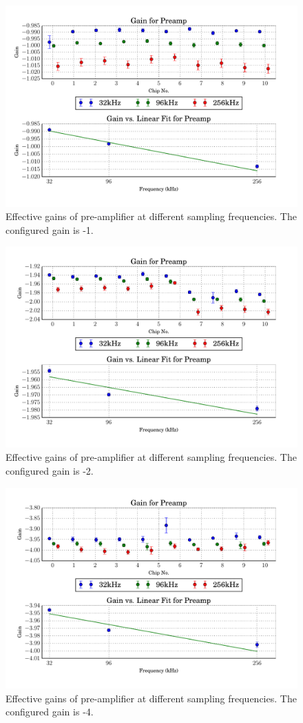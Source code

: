 \begin{figure}
    \centering
    \includegraphics[width=.7\linewidth]{images/plots/dc_slope_preamp_gain-1.pdf}
    \caption{Effective gains of pre-amplifier at different sampling frequencies. The configured gain is -1.}
    \label{fig:preamp_slope-1}
\end{figure}
\begin{figure}
    \centering
    \includegraphics[width=.7\linewidth]{images/plots/dc_slope_preamp_gain-2.pdf}
    \caption{Effective gains of pre-amplifier at different sampling frequencies. The configured gain is -2.}
    \label{fig:preamp_slope-2}
\end{figure}
\begin{figure}
    \centering
    \includegraphics[width=.7\linewidth]{images/plots/dc_slope_preamp_gain-4.pdf}
    \caption{Effective gains of pre-amplifier at different sampling frequencies. The configured gain is -4.}
    \label{fig:preamp_slope-4}
\end{figure}

